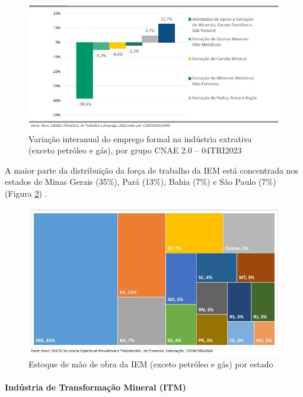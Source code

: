 \begin{figure}[!htb]
    \centering
    \includegraphics[width=\textwidth]{figures/image7_variacao_emprego_4tri2023.png}
    \caption{Variação interanual do emprego formal na indústria extrativa (exceto petróleo e gás), por grupo CNAE 2.0 -- 04TRI2023}
    \label{fig:variacao_emprego_4tri2023}
\end{figure}

A maior parte da distribuição da força de trabalho da IEM está concentrada nos estados de Minas Gerais (35\%), Pará (13\%), Bahia (7\%) e São Paulo (7\%) (Figura \ref{fig:estoque_mao_obra}) \cite{anm2023}.

\begin{figure}[!htb]
    \centering
    \includegraphics[width=\textwidth]{figures/image8_estoque_mao_obra.png}
    \caption{Estoque de mão de obra da IEM (exceto petróleo e gás) por estado}
    \label{fig:estoque_mao_obra}
\end{figure}

\paragraph{Indústria de Transformação Mineral (ITM)}

